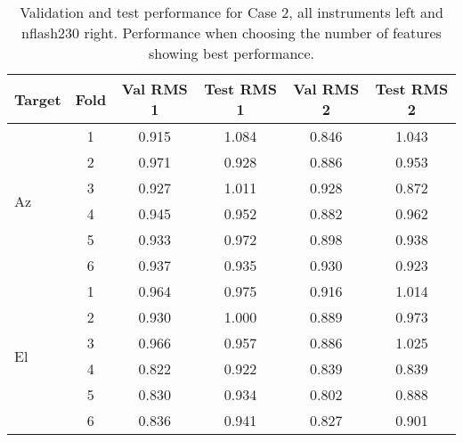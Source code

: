 \begin{table}
    \centering
    \caption{Validation and test performance for Case 2, all instruments left and nflash230 right.
    Performance when choosing the number of features showing best performance.}
    \begin{tabular}{lccccc}
        \toprule
        Target & Fold & Val RMS 1 &  Test RMS 1 &  Val RMS 2 &  Test RMS 2 \\
        \midrule
        \multirow{6}{*}{Az} & 1 &      0.915 &       1.084 &      0.846 &       1.043 \\
                            & 2 &      0.971 &       0.928 &      0.886 &       0.953 \\
                            & 3 &      0.927 &       1.011 &      0.928 &       0.872 \\
                            & 4 &      0.945 &       0.952 &      0.882 &       0.962 \\
                            & 5 &      0.933 &       0.972 &      0.898 &       0.938 \\
                            & 6 &      0.937 &       0.935 &      0.930 &       0.923 \\ 
        \hline
        \multirow{6}{*}{El} & 1 &      0.964 &       0.975 &      0.916 &       1.014 \\
                            & 2 &      0.930 &       1.000 &      0.889 &       0.973 \\
                            & 3 &      0.966 &       0.957 &      0.886 &       1.025 \\
                            & 4 &      0.822 &       0.922 &      0.839 &       0.839 \\
                            & 5 &      0.830 &       0.934 &      0.802 &       0.888 \\
                            & 6 &      0.836 &       0.941 &      0.827 &       0.901 \\
        \bottomrule
    \end{tabular}
\end{table}
    

